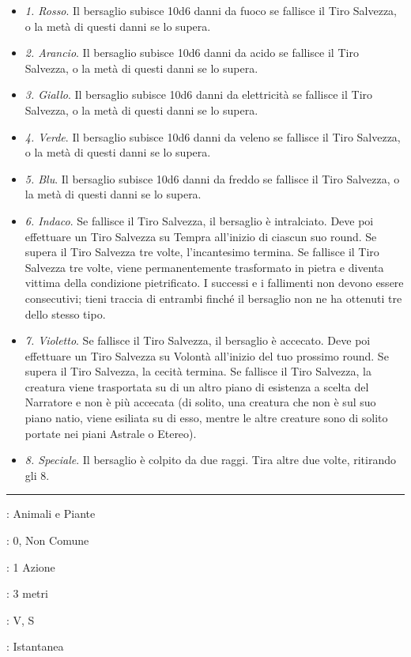 \begin{multicols}{2}
\begin{itemize}[leftmargin=*] \setlength{\itemsep}{0pt}
	\item \emph{1. Rosso}. Il bersaglio subisce 10d6 danni da fuoco se fallisce il Tiro Salvezza, o la metà di questi danni se lo supera.
	\item \emph{2. Arancio}. Il bersaglio subisce 10d6 danni da acido se fallisce il Tiro Salvezza, o la metà di questi danni se lo supera.
	\item \emph{3. Giallo}. Il bersaglio subisce 10d6 danni da elettricità se fallisce il Tiro Salvezza, o la metà di questi danni se lo supera.
	\item \emph{4. Verde}. Il bersaglio subisce 10d6 danni da veleno se fallisce il Tiro Salvezza, o la metà di questi danni se lo supera.
	\item \emph{5. Blu}. Il bersaglio subisce 10d6 danni da freddo se fallisce il Tiro Salvezza, o la metà di questi danni se lo supera.
	\item \emph{6. Indaco}. Se fallisce il Tiro Salvezza, il bersaglio è intralciato. Deve poi effettuare un Tiro Salvezza su Tempra all'inizio di ciascun suo round. Se supera il Tiro Salvezza tre volte, l'incantesimo termina. Se fallisce il Tiro Salvezza tre volte, viene permanentemente trasformato in pietra e diventa vittima della condizione pietrificato. I successi e i fallimenti non devono essere consecutivi; tieni traccia di entrambi finché il bersaglio non ne ha ottenuti tre dello stesso tipo.
	\item \emph{7. Violetto}. Se fallisce il Tiro Salvezza, il bersaglio è accecato. Deve poi effettuare un Tiro Salvezza su Volontà all'inizio del tuo prossimo round. Se supera il Tiro Salvezza, la cecità termina. Se fallisce il Tiro Salvezza, la creatura viene trasportata su di un altro piano di esistenza a scelta del Narratore e non è più accecata (di solito, una creatura che non è sul suo piano natio, viene esiliata su di esso, mentre le altre creature sono di solito portate nei piani Astrale o Etereo).
	\item \emph{8. Speciale}. Il bersaglio è colpito da due raggi. Tira altre due volte, ritirando gli 8.

\end{itemize}

\smallskip\noindent\rule{\linewidth}{2pt} \hypertarget{Spruzzo Velenoso}{}\medskip{}
\noindent
\begin{description}[noitemsep, topsep=0pt, parsep=0pt, partopsep=0pt, leftmargin=0cm, labelwidth=2.8cm]
	\item[\textbf{Lista di Magia}]: Animali e Piante
	\item[\textbf{Livello}]: 0, Non Comune
	\item[\textbf{T. di Lancio}]: 1 Azione
	\item[\textbf{Gittata}]: 3 metri
	\item[\textbf{Componenti}]: V, S
	\item[\textbf{Durata}]: Istantanea
\end{description}


\end{multicols}
